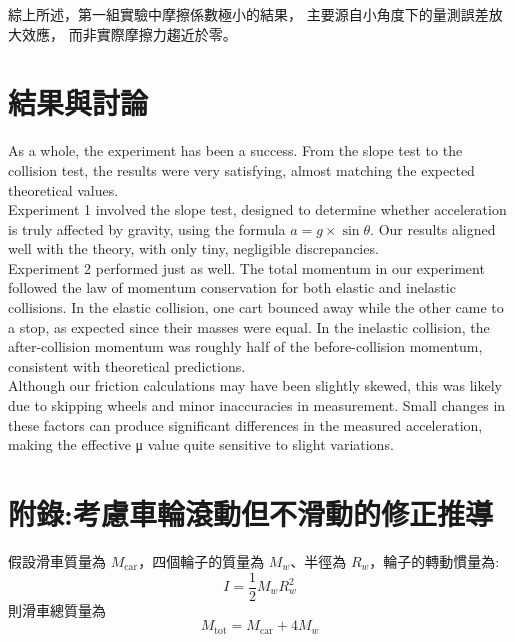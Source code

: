 \documentclass[12pt]{article}
\begin{document}
綜上所述，第一組實驗中摩擦係數極小的結果，
主要源自小角度下的量測誤差放大效應，
而非實際摩擦力趨近於零。








\newpage

\section{\textbf{結果與討論}}

As a whole, the experiment has been a success. From the slope test to the collision test, the results were very satisfying, almost matching the expected theoretical values. \\

Experiment 1 involved the slope test, designed to determine whether acceleration is truly affected by gravity, using the formula $a=g\times\sin\theta$. Our results aligned well with the theory, with only tiny, negligible discrepancies.\\

Experiment 2 performed just as well. The total momentum in our experiment followed the law of momentum conservation for both elastic and inelastic collisions. In the elastic collision, one cart bounced away while the other came to a stop, as expected since their masses were equal. In the inelastic collision, the after-collision momentum was roughly half of the before-collision momentum, consistent with theoretical predictions.\\

Although our friction calculations may have been slightly skewed, this was likely due to skipping wheels and minor inaccuracies in measurement. Small changes in these factors can produce significant differences in the measured acceleration, making the effective μ value quite sensitive to slight variations.
\newpage
\section*{附錄:考慮車輪滾動但不滑動的修正推導}
\noindent
假設滑車質量為 $M_{\text{car}}$，四個輪子的質量為 $M_w$、半徑為 $R_w$，輪子的轉動慣量為:
\[
I = \frac{1}{2} M_w R_w^2
\]
則滑車總質量為
\[
M_{\text{tot}} = M_{\text{car}} + 4M_w
\]
\end{document}
